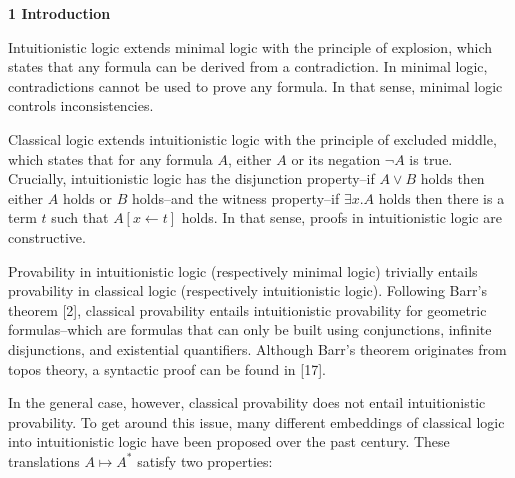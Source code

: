 
 
\par\medskip\noindent\textbf{1 Introduction}\par
 
 
Intuitionistic logic extends minimal logic with the principle of explosion, which states that any formula can be derived from a contradiction. In minimal logic, contradictions cannot be used to prove any formula. In that sense, minimal logic controls inconsistencies.\par
 
\begin{center}\end{center}
 
Classical logic extends intuitionistic logic with the principle of excluded middle, which states that for any formula $A$, either $A$ or its negation $\neg A$ is true. Crucially, intuitionistic logic has the disjunction property–if $A\mathbin{\vee}B$ holds then either $A$ holds or $B$ holds–and the witness property–if ${\exists}x.A$ holds then there is a term $t$ such that $A[x\leftarrow t]$ holds. In that sense, proofs in intuitionistic logic are constructive.\par
 
 
 
Provability in intuitionistic logic (respectively minimal logic) trivially entails provability in classical logic (respectively intuitionistic logic). Following Barr’s theorem [2], classical provability entails intuitionistic provability for geometric formulas–which are formulas that can only be built using conjunctions, infinite disjunctions, and existential quantifiers. Although Barr’s theorem originates from topos theory, a syntactic proof can be found in [17].\par
 
 
 
In the general case, however, classical provability does not entail intuitionistic provability. To get around this issue, many different embeddings of classical logic into intuitionistic logic have been proposed over the past century. These translations $A\mapsto A^{*}$ satisfy two properties:\par
  
